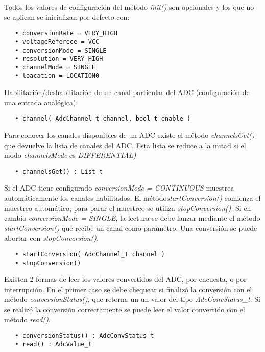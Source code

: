 Todos los valores de configuración del método \emph{init()} son opcionales y los que no se aplican se inicializan por defecto con:

\begin{verbatim}
   • conversionRate = VERY_HIGH
   • voltageReferece = VCC
   • conversionMode = SINGLE
   • resolution = VERY_HIGH
   • channelMode = SINGLE
   • loacation = LOCATION0
\end{verbatim}

Habilitación/deshabilitación de un canal particular del ADC (configuración de una entrada analógica):

\begin{verbatim}
   • channel( AdcChannel_t channel, bool_t enable )
\end{verbatim}

Para conocer los canales disponibles de un ADC existe el método 
\emph{channelsGet()} que devuelve la lista de canales del ADC. Esta lista se reduce a la mitad si el modo \emph{channelsMode} es \emph{DIFFERENTIAL)}

\begin{verbatim}
   • channelsGet() : List_t
\end{verbatim}

Si el ADC tiene configurado \emph{conversionMode = CONTINUOUS} muestrea automáticamente los canales habilitados. El método\emph{startConversion()} comienza el muestreo automático, para parar el muestreo se utiliza \emph{stopConversion()}. Si en cambio \emph{conversionMode = SINGLE}, la lectura se debe lanzar mediante el método \emph{startConversion()} que recibe un canal como parámetro. 
Una conversión se puede abortar con \emph{stopConversion()}.

\begin{verbatim}
   • startConversion( AdcChannel_t channel )
   • stopConversion()
\end{verbatim}

Existen 2 formas de leer los valores convertidos del ADC, por encuesta, o por interrupción. En el primer caso se debe chequear si finalizó la conversión con el método \emph{conversionStatus()}, que retorna un un valor del tipo \emph{AdcConvStatus\_t}. Si se realizó la conversión correctamente se puede leer el valor convertido con el método \emph{read()}.

\begin{verbatim}
   • conversionStatus() : AdcConvStatus_t
   • read() : AdcValue_t
\end{verbatim}

